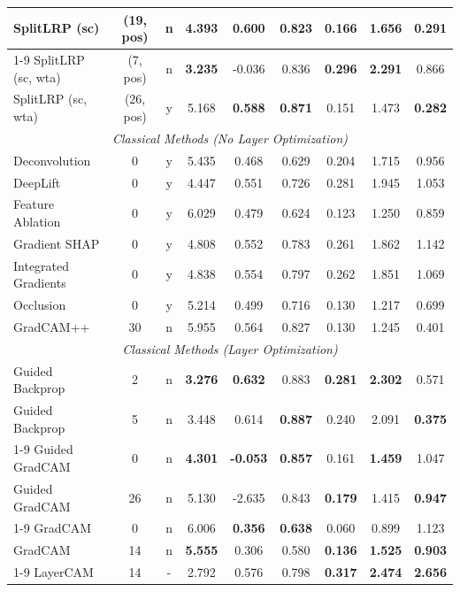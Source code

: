 \begin{longtable}{p{4cm}|cc|cccccc}
    SplitLRP (sc) & (19, pos) & n & 4.393 & \textbf{0.600} & 0.823 & 0.166 & 1.656 & \textbf{0.291} \\
    \cmidrule(lr){1-9}
    SplitLRP (sc, wta) & (7, pos) & n & \textbf{3.235} & -0.036 & 0.836 & \textbf{0.296} & \textbf{2.291} & 0.866 \\
    SplitLRP (sc, wta) & (26, pos) & y & 5.168 & \textbf{0.588} & \textbf{0.871} & 0.151 & 1.473 & \fboxsep=0.5pt\colorbox{red!20}{\textbf{0.282}} \\
    \midrule
    \multicolumn{9}{c}{\textit{Classical Methods (No Layer Optimization)}} \\
    \midrule
    Deconvolution & 0 & y & 5.435 & 0.468 & 0.629 & 0.204 & 1.715 & 0.956 \\
    DeepLift & 0 & y & 4.447 & 0.551 & 0.726 & 0.281 & 1.945 & 1.053 \\
    Feature Ablation & 0 & y & 6.029 & 0.479 & 0.624 & 0.123 & 1.250 & 0.859 \\
    Gradient SHAP & 0 & y & 4.808 & 0.552 & 0.783 & 0.261 & 1.862 & 1.142 \\
    Integrated Gradients & 0 & y & 4.838 & 0.554 & 0.797 & 0.262 & 1.851 & 1.069 \\
    Occlusion & 0 & y & 5.214 & 0.499 & 0.716 & 0.130 & 1.217 & 0.699 \\
    GradCAM++ & 30 & n & 5.955 & 0.564 & 0.827 & 0.130 & 1.245 & 0.401 \\
    \midrule
    \multicolumn{9}{c}{\textit{Classical Methods (Layer Optimization)}} \\
    \midrule
    Guided Backprop & 2 & n & \textbf{3.276} & \textbf{0.632} & 0.883 & \textbf{0.281} & \textbf{2.302} & 0.571 \\
    Guided Backprop & 5 & n & 3.448 & 0.614 & \textbf{0.887} & 0.240 & 2.091 & \textbf{0.375} \\
    \cmidrule(lr){1-9}
    Guided GradCAM & 0 & n & \textbf{4.301} & \textbf{-0.053} & \textbf{0.857} & 0.161 & \textbf{1.459} & 1.047 \\
    Guided GradCAM & 26 & n & 5.130 & -2.635 & 0.843 & \textbf{0.179} & 1.415 & \textbf{0.947} \\
    \cmidrule(lr){1-9}
    GradCAM & 0 & n & 6.006 & \textbf{0.356} & \textbf{0.638} & 0.060 & 0.899 & 1.123 \\
    GradCAM & 14 & n & \textbf{5.555} & 0.306 & 0.580 & \textbf{0.136} & \textbf{1.525} & \textbf{0.903} \\
    \cmidrule(lr){1-9}
    LayerCAM & 14 & - & 2.792 & 0.576 & 0.798 & \fboxsep=0.5pt\colorbox{red!20}{\textbf{0.317}} & \fboxsep=0.5pt\colorbox{red!20}{\textbf{2.474}} & \textbf{2.656} \\

\end{longtable}
